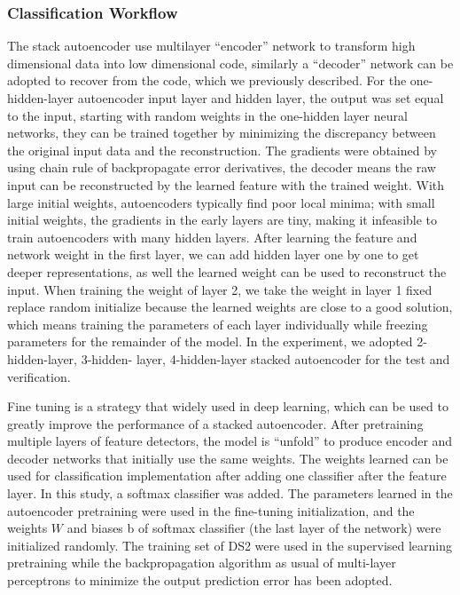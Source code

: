 \documentclass[graybox]{svmult}
\begin{document}
\subsubsection{Classification Workflow}
The stack autoencoder use multilayer “encoder” network to transform high dimensional data into low dimensional code, similarly a “decoder” network can be adopted to recover from the code, which we previously described. For the one-hidden-layer autoencoder input layer and hidden layer, the output was set equal to the input, starting with random weights in the one-hidden layer neural networks, they can be trained together by minimizing the discrepancy between the original input data and the reconstruction. The gradients were obtained by using chain rule of backpropagate error derivatives, the decoder means the raw input can be reconstructed by the learned feature with the trained weight. With large initial weights, autoencoders typically find poor local minima; with small initial weights, the gradients in the early layers are tiny, making it infeasible to train autoencoders with many hidden layers. After learning the feature and network weight in the first layer, we can add hidden layer one by one to get deeper representations, as well the learned weight can be used to reconstruct the input. When training the weight of layer 2, we take the weight in layer 1 fixed replace random initialize because the learned weights are close to a good solution, which means training the parameters of each layer individually while freezing parameters for the remainder of the model. In the experiment, we adopted 2-hidden-layer, 3-hidden- layer, 4-hidden-layer stacked autoencoder for the test and verification.

Fine tuning is a strategy that widely used in deep learning, which can be used to greatly improve the performance of a stacked autoencoder. After pretraining multiple layers of feature detectors, the model is “unfold” to produce encoder and decoder networks that initially use the same weights. The weights learned can be used for classification implementation after adding one classifier after the feature layer. In this study, a softmax classifier was added. The parameters learned in the autoencoder pretraining were used in the fine-tuning initialization, and the weights $W$ and biases b of softmax classifier (the last layer of the network) were initialized randomly. The training set of DS2 were used in the supervised learning pretraining while the backpropagation algorithm as usual of multi-layer perceptrons to minimize the output prediction error has been adopted.
\end{document}
